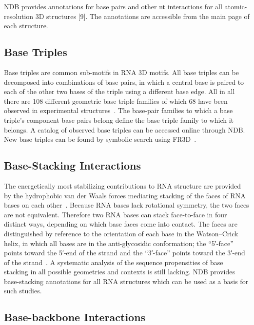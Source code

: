NDB provides annotations for base pairs and other nt interactions for all
atomic-resolution 3D structures [9]. The annotations are accessible from the
main page of each structure. 

\subsection{Base Triples}

Base triples are common sub-motifs in RNA 3D motifs. All base triples can be
decomposed into combinations of base pairs, in which a central base is paired to
each of the other two bases of the triple using a different base edge. All in
all there are 108 different geometric base triple families of which 68 have been
observed in experimental structures~\cite{AbuAlmakarem2012b}. The base-pair
families to which a base triple's component base pairs belong define the base
triple family to which it belongs. A catalog of observed base triples can be
accessed online through NDB\@. New base triples can be found by symbolic search
using FR3D~\cite{Petrov2011a}. 

\subsection{Base-Stacking Interactions}

The energetically most stabilizing contributions to RNA structure are provided
by the hydrophobic van der Waals forces mediating stacking of the faces of RNA
bases on each other~\cite{Sponer2010}. Because RNA bases lack rotational
symmetry, the two faces are not equivalent. Therefore two RNA bases can stack
face-to-face in four distinct ways, depending on which base faces come into
contact. The faces are distinguished by reference to the orientation of each
base in the Watson–Crick helix, in which all bases are in the anti-glycosidic
conformation; the ``5′-face'' points toward the 5′-end of the strand and the
``3′-face'' points toward the 3′-end of the strand~\cite{Hoehndorf2011,
Sarver2008a}. A systematic analysis of the sequence propensities of base
stacking in all possible geometries and contexts is still lacking. NDB provides
base-stacking annotations for all RNA structures which can be used as a basis
for such studies. 

\subsection{Base-backbone Interactions }

